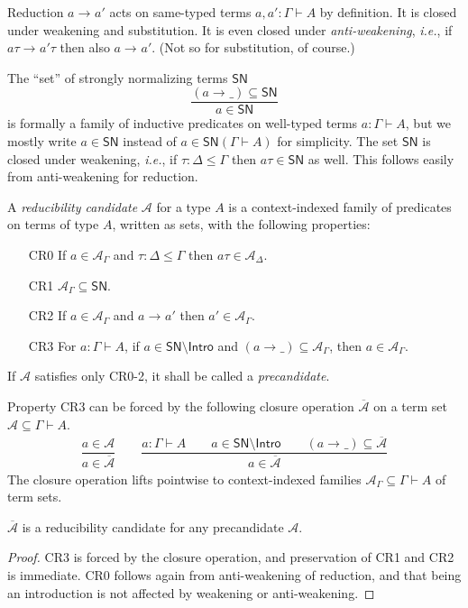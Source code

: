 \documentclass[a4paper,USenglish,cleveref, autoref, thm-restate]{lipics-v2019}
\newcommand{\ie}{\emph{i.e.}\xspace}
\newcommand{\ru}{\dfrac}
\newcommand{\red}[1][]{\longrightarrow_{#1}}
\newcommand{\cl}[1]{\overline{#1}}
\newcommand{\A}{\mathcal{A}}
\newcommand{\SN}{\mathsf{SN}}
\newcommand{\Intro}{\mathsf{Intro}}
\begin{document}
Reduction $a \red a'$ acts on same-typed terms
$a,a' : \Gamma \vdash A$ by definition.  It is closed under weakening
and substitution.  It is even closed under \emph{anti-weakening}, \ie,
if $a\tau \red a'\tau$ then also $a \red a'$.  (Not so for
substitution, of course.)

The ``set'' of strongly normalizing terms $\SN$
\[
  \ru{(a \red \_) \subseteq \SN
    }{a \in \SN}
\]
is formally a family of inductive predicates on well-typed terms
$a : \Gamma \vdash A$, but we mostly write $a \in \SN$ instead of
$a \in \SN(\Gamma \vdash A)$ for simplicity.  The set $\SN$ is closed
under weakening, \ie, if $\tau : \Delta \leq \Gamma$ then
$a\tau \in \SN$ as well.  This follows easily from anti-weakening for
reduction.

A \emph{reducibility candidate} $\A$ for a type $A$ is a context-indexed
family of predicates on terms of type $A$, written as sets, with the following
properties:
\begin{itemize}
\item[CR0]  If $a \in \A_\Gamma$ and $\tau : \Delta \leq \Gamma$ then
  $a\tau \in \A_\Delta$.
\item[CR1]  $\A_\Gamma \subseteq \SN$.
\item[CR2]  If $a \in \A_\Gamma$ and $a \red a'$ then $a' \in
  \A_\Gamma$.
\item[CR3]  For $a : \Gamma \vdash A$, if $a \in \SN \setminus \Intro$
  and $(a \red \_) \subseteq \A_\Gamma$, then $a \in \A_\Gamma$.
\end{itemize}
If $\A$ satisfies only CR0-2, it shall be called a \emph{precandidate}.

Property CR3 can be forced by the following closure operation $\cl\A$
on a term set $\A \subseteq \Gamma \vdash A$.
\begin{gather*}
  \ru{a \in \A
    }{a \in \cl\A}
\qquad
  \ru{a : \Gamma \vdash A \qquad
      a \in \SN \setminus \Intro \qquad
      (a \red \_) \subseteq \cl\A
    }{a \in \cl\A}
\end{gather*}
The closure operation lifts pointwise to context-indexed families
$\A_\Gamma \subseteq \Gamma \vdash A$ of term sets.

\begin{lemma}[Saturation]
  $\cl\A$ is a reducibility candidate for any precandidate $\A$.
\end{lemma}
\begin{proof}
  CR3 is forced by the closure operation, and preservation of CR1 and
  CR2 is immediate.
  CR0 follows again from anti-weakening of reduction, and that being
  an introduction is not affected by weakening or anti-weakening.
\end{proof}
\end{document}
